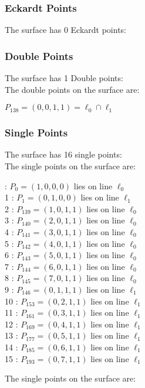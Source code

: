 \documentclass{article}
\begin{document}
{\subsubsection*{Eckardt Points}
The surface has 0 Eckardt points:\\
\subsubsection*{Double Points}
The surface has 1 Double points:\\
The double points on the surface are:\\
\begin{multicols}{2}
\noindent
$P_{138} = ( 0, 0, 1, 1 ) = \ell_{0} \cap \ell_{1} $\\
\end{multicols}
\subsubsection*{Single Points}
The surface has 16 single points:\\
The single points on the surface are:\\
\begin{multicols}{2}
 : $P_{0}=( 1, 0, 0, 0 )$ lies on line $\ell_{0}$\\
1 : $P_{1}=( 0, 1, 0, 0 )$ lies on line $\ell_{1}$\\
2 : $P_{139}=( 1, 0, 1, 1 )$ lies on line $\ell_{0}$\\
3 : $P_{140}=( 2, 0, 1, 1 )$ lies on line $\ell_{0}$\\
4 : $P_{141}=( 3, 0, 1, 1 )$ lies on line $\ell_{0}$\\
5 : $P_{142}=( 4, 0, 1, 1 )$ lies on line $\ell_{0}$\\
6 : $P_{143}=( 5, 0, 1, 1 )$ lies on line $\ell_{0}$\\
7 : $P_{144}=( 6, 0, 1, 1 )$ lies on line $\ell_{0}$\\
8 : $P_{145}=( 7, 0, 1, 1 )$ lies on line $\ell_{0}$\\
9 : $P_{146}=( 0, 1, 1, 1 )$ lies on line $\ell_{1}$\\
10 : $P_{153}=( 0, 2, 1, 1 )$ lies on line $\ell_{1}$\\
11 : $P_{161}=( 0, 3, 1, 1 )$ lies on line $\ell_{1}$\\
12 : $P_{169}=( 0, 4, 1, 1 )$ lies on line $\ell_{1}$\\
13 : $P_{177}=( 0, 5, 1, 1 )$ lies on line $\ell_{1}$\\
14 : $P_{185}=( 0, 6, 1, 1 )$ lies on line $\ell_{1}$\\
15 : $P_{193}=( 0, 7, 1, 1 )$ lies on line $\ell_{1}$\\
\end{multicols}
The single points on the surface are:\\
}
\end{document}
